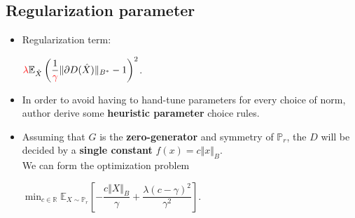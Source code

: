 \documentclass[landscape,headrule,footrule]{foils}
\begin{document}
\subsection{Regularization parameter}
\tableofcontents
\begin{frame}
\begin{flushleft}
\begin{itemize}
\item Regularization term:
\begin{center}
$ \textcolor{red}{\lambda} \mathbb{E}_{\hat{X}} \left(\dfrac{1}{\textcolor{red}{\gamma}} \Vert \partial D(\hat{X})\Vert_{B^*} - 1 \right)^2$. \\
\end{center}
\item In order to avoid having to hand-tune parameters for every choice of norm, author derive some \textbf{heuristic parameter} choice rules. \\
\item Assuming that $G$ is the \textbf{zero-generator} and symmetry of $\mathbb{P}_r$, the $D$ will be decided by a \textbf{single constant} $f(x) = c \Vert x \Vert_B$. \\
We can form the optimization problem
\begin{center}
$\mathop{\min}_{c \in \mathbb{R}} \mathbb{E}_{X \sim \mathbb{P}_r} \left[-\dfrac{c \Vert X \Vert_B}{\gamma} + \dfrac{\lambda(c- \gamma)^2}{\gamma^2} \right]$.
\end{center}

\end{itemize}
\end{flushleft}
\end{frame}
\end{document}
